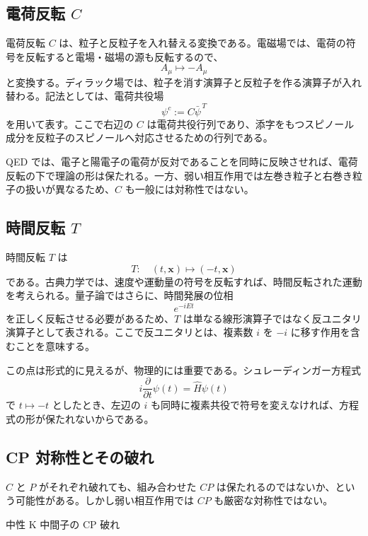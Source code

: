 \subsection{電荷反転 $C$}
電荷反転 $C$ は、粒子と反粒子を入れ替える変換である。電磁場では、電荷の符号を反転すると電場・磁場の源も反転するので、
\[
A_\mu\mapsto -A_\mu
\]
と変換する。ディラック場では、粒子を消す演算子と反粒子を作る演算子が入れ替わる。記法としては、電荷共役場
\[
\psi^c:=C\bar{\psi}^{\,T}
\]
を用いて表す。ここで右辺の $C$ は電荷共役行列であり、添字をもつスピノール成分を反粒子のスピノールへ対応させるための行列である。

QED では、電子と陽電子の電荷が反対であることを同時に反映させれば、電荷反転の下で理論の形は保たれる。一方、弱い相互作用では左巻き粒子と右巻き粒子の扱いが異なるため、$C$ も一般には対称性ではない。

\subsection{時間反転 $T$}
時間反転 $T$ は
\[
T:\quad (t,\mathbf{x})\mapsto(-t,\mathbf{x})
\]
である。古典力学では、速度や運動量の符号を反転すれば、時間反転された運動を考えられる。量子論ではさらに、時間発展の位相
\[
e^{-iEt}
\]
を正しく反転させる必要があるため、$T$ は単なる線形演算子ではなく反ユニタリ演算子として表される。ここで反ユニタリとは、複素数 $i$ を $-i$ に移す作用を含むことを意味する。

この点は形式的に見えるが、物理的には重要である。シュレーディンガー方程式
\[
i\frac{\partial}{\partial t}\psi(t)=\hat{H}\psi(t)
\]
で $t\mapsto -t$ としたとき、左辺の $i$ も同時に複素共役で符号を変えなければ、方程式の形が保たれないからである。

\subsection{CP 対称性とその破れ}
$C$ と $P$ がそれぞれ破れても、組み合わせた $CP$ は保たれるのではないか、という可能性がある。しかし弱い相互作用では $CP$ も厳密な対称性ではない。

\begin{experimentalfact}{中性 K 中間子の CP 破れ}
\end{experimentalfact}

